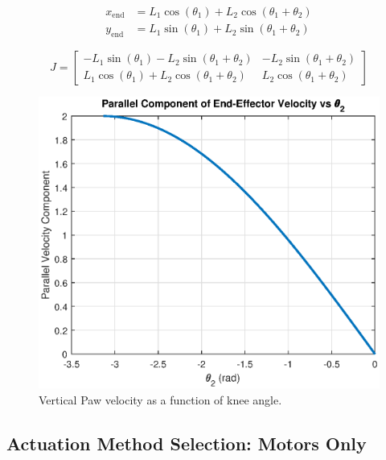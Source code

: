 \begin{equation}
    \label{eq:2_link_manipulator}
    \begin{aligned}
        x_{\text{end}} &= L_1 \cos(\theta_1) + L_2 \cos(\theta_1 + \theta_2) \\
        y_{\text{end}} &= L_1 \sin(\theta_1) + L_2 \sin(\theta_1 + \theta_2)
    \end{aligned}
\end{equation}

\begin{equation}
    \label{eq:jacobian_vertical_jump_leg}
    J = \begin{bmatrix} 
    -L_1 \sin(\theta_1) - L_2 \sin(\theta_1 + \theta_2) & -L_2 \sin(\theta_1 + \theta_2) \\
    L_1 \cos(\theta_1) + L_2 \cos(\theta_1 + \theta_2) & L_2 \cos(\theta_1 + \theta_2)
    \end{bmatrix}
\end{equation}

\begin{figure}[h]
    \centering
    \includegraphics[width=\textwidth]{Images/vertical_paw_velocity.eps}
    \caption{Vertical Paw velocity as a function of knee angle.}
    \label{fig:vertical_jacobian_velocity}
\end{figure}

\subsection{Actuation Method Selection: Motors Only}
\label{sec:design_motor_only_jumps}

